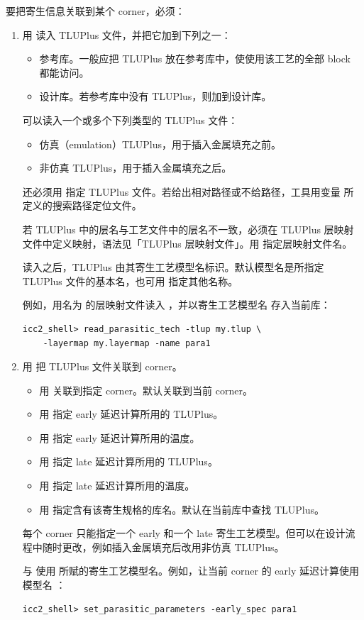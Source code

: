 要把寄生信息关联到某个 corner，必须：
\begin{enumerate}
  \item 用  读入 TLUPlus 文件，并把它加到下列之一：
  \begin{itemize}
    \item 参考库。一般应把 TLUPlus 放在参考库中，使使用该工艺的全部 block 都能访问。
    \item 设计库。若参考库中没有 TLUPlus，则加到设计库。
  \end{itemize}
        可以读入一个或多个下列类型的 TLUPlus 文件：
  \begin{itemize}
    \item 仿真（emulation）TLUPlus，用于插入金属填充之前。
    \item 非仿真 TLUPlus，用于插入金属填充之后。
  \end{itemize}
        还必须用  指定 TLUPlus 文件。若给出相对路径或不给路径，工具用变量  所定义的搜索路径定位文件。

        若 TLUPlus 中的层名与工艺文件中的层名不一致，必须在 TLUPlus 层映射文件中定义映射，语法见「TLUPlus 层映射文件」。用  指定层映射文件名。

        读入之后，TLUPlus 由其寄生工艺模型名标识。默认模型名是所指定 TLUPlus 文件的基本名，也可用  指定其他名称。

        例如，用名为  的层映射文件读入 ，并以寄生工艺模型名  存入当前库：
\begin{lstlisting}
icc2_shell> read_parasitic_tech -tlup my.tlup \
    -layermap my.layermap -name para1
\end{lstlisting}
  \item 用  把 TLUPlus 文件关联到 corner。
  \begin{itemize}
    \item 用  关联到指定 corner。默认关联到当前 corner。
    \item 用  指定 early 延迟计算所用的 TLUPlus。
    \item 用  指定 early 延迟计算所用的温度。
    \item 用  指定 late 延迟计算所用的 TLUPlus。
    \item 用  指定 late 延迟计算所用的温度。
    \item 用  指定含有该寄生规格的库名。默认在当前库中查找 TLUPlus。
  \end{itemize}
        每个 corner 只能指定一个 early 和一个 late 寄生工艺模型。但可以在设计流程中随时更改，例如插入金属填充后改用非仿真 TLUPlus。

         与  使用  所赋的寄生工艺模型名。例如，让当前 corner 的 early 延迟计算使用模型名 ：
\begin{lstlisting}
icc2_shell> set_parasitic_parameters -early_spec para1
\end{lstlisting}
\end{enumerate}

